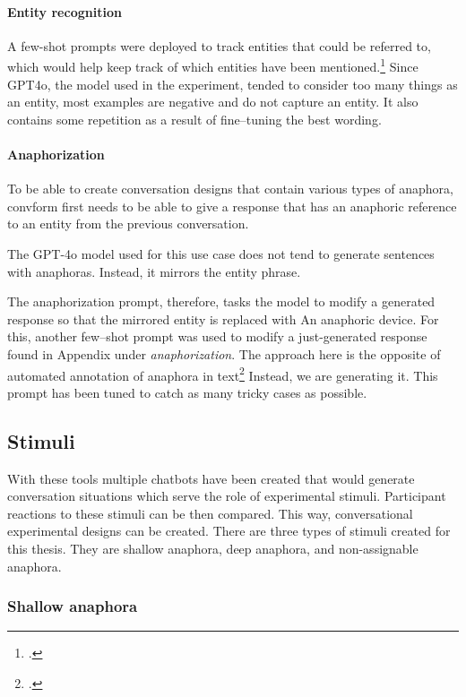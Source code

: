 \documentclass[12pt]{report}
\begin{document}
{\paragraph{Entity recognition}

A few-shot prompts were deployed to track entities that could be referred to, which would help
keep track of which entities have been mentioned.\footcite{Loiciga2022NewOO}
Since GPT4o, the model used in the experiment,
tended to consider too many things as an entity,
most examples are negative and do not capture an entity.
It also contains some repetition as a result of fine–tuning the best wording.

\paragraph{Anaphorization}

To be able to create conversation designs that contain various types of anaphora,
convform first needs to be able to give a response that
has an anaphoric reference to an entity from the previous conversation.

The GPT-4o model used for this use case
does not tend to generate sentences with anaphoras.
Instead, it mirrors the entity phrase.

The anaphorization prompt, therefore, tasks the model
to modify a generated response so
that the mirrored entity is replaced with
An anaphoric device.
For this, another few–shot prompt was used to modify a just-generated response
found in Appendix under \textit{anaphorization}.
The approach here is the opposite of automated annotation of anaphora in text\footcite{loaiciga-etal-2022-anaphoric}
Instead, we are generating it.
This prompt has been tuned to catch as many tricky cases as possible.

\subsection{Stimuli}

With these tools
multiple chatbots have been created
that would generate conversation situations
which serve the role of experimental stimuli.
Participant reactions to these stimuli
can be then compared.
This way, conversational experimental designs can be created.
There are three types of stimuli created
for this thesis.
They are shallow anaphora, deep anaphora, and non-assignable anaphora.

\subsubsection{Shallow anaphora}

}
\end{document}
